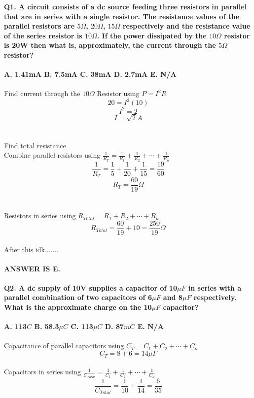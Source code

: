 \documentclass[12pt]{article}
\begin{document}
\noindent  \textbf{Q1. A circuit consists of a dc source feeding three resistors in parallel that are in series with a single resistor. The resistance values of the parallel resistors are \(5\Omega\), \(20\Omega\), \(15\Omega\) respectively and the resistance value of the series resistor is \(10\Omega\). If the power dissipated by the \(10\Omega\) resistor is 20W then what is, approximately, the current through the \(5\Omega\) resistor?}\\
\\
\noindent \textbf{A. 1.41mA B. 7.5mA C. 38mA D. 2.7mA E. N/A}\\
\\
Find current through the \(10\Omega\) Resistor using \(P = I^2R\)\\
\[20 = I^2(10)\]
\[I^2 = 2\]
\[I = \sqrt{2}A\]\\
\\
Find total resistance\\
Combine parallel resistors using \(\frac{1}{R_T} = \frac{1}{R_1} + \frac{1}{R_2} + \cdots + \frac{1}{R_n}\)\\
\[\frac{1}{R_T} = \frac{1}{5} + \frac{1}{20} + \frac{1}{15} = \frac{19}{60}\]
\[R_T = \frac{60}{19}\Omega\]\\
\\
Resistors in series using \(R_{Total} = R_1 + R_2 + \cdots + R_n\)\\
\[R_{Total} = \frac{60}{19} + 10 = \frac{250}{19}\Omega\]\\
After this idk.......\\
\\
\textbf{ANSWER IS E.}\\
\\
\textbf{Q2. A dc supply of 10V supplies a capacitor of 10\(\mu F\) in series with a parallel combination of two capacitors of 6\(\mu F\) and 8\(\mu F\) respectively. What is the approximate charge on the 10\(\mu F\) capacitor?\\
\\
A. 113\(C\) B. 58.3\(\mu C\) C. 113\(\mu C\) D. 87\(mC\) E. N/A}\\
\\
Capacitance of parallel capacitors using \(C_T = C_1 + C_2 + \cdots + C_n\)\\
\[C_T = 8 + 6 = 14 \mu F\]\\
Capacitors in series using \(\frac{1}{C_{Total}} = \frac{1}{C_1} + \frac{1}{C_2} + \cdots + \frac{1}{C_n}\)\\
\[\frac{1}{C_{Total}} = \frac{1}{10} + \frac{1}{14} = \frac{6}{35}\]\\
\end{document}
